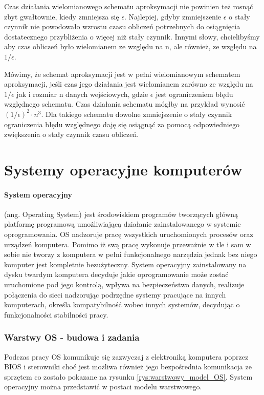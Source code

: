 \documentclass[a4paper,twoside]{report}
\begin{document}
Czas działania wielomianowego schematu aproksymacji nie powinien też rosnąć zbyt gwałtownie, kiedy zmniejsza się $\epsilon$. Najlepiej, gdyby zmniejszenie  $\epsilon$ o stały czynnik nie powodowało wzrostu czasu obliczeń potrzebnych do osiągnięcia dostatecznego przybliżenia o więcej niż stały czynnik. Innymi słowy, chcielibyśmy aby czas obliczeń było wielomianem ze względu na n, ale również, ze względu na $1/\epsilon$.

Mówimy, że schemat aproksymacji jest w pełni wielomianowym schematem aproksymacji, jeśli czas jego działania jest wielomianem zarówno ze względu na $1/\epsilon$ jak i rozmiar n danych wejściowych, gdzie $\epsilon$ jest ograniczeniem błędu względnego schematu. Czas działania schematu mógłby na przykład wynosić $ (1/\epsilon)^2 \cdot n^3 $. Dla takiego schematu dowolne zmniejszenie o stały czynnik ograniczenia błędu względnego daję się osiągnąć za pomocą odpowiedniego zwiększenia o stały czynnik czasu obliczeń.



\section{Systemy operacyjne komputerów}

\paragraph{System operacyjny}
(ang. Operating System) jest środowiskiem programów tworzących główną platformę programową umożliwiającą działanie zainstalowanego w systemie oprogramowania. OS nadzoruje pracę wszystkich uruchomionych procesów oraz urządzeń komputera. Pomimo iż swą pracę wykonuje przeważnie w tle i sam w sobie nie tworzy z komputera w pełni funkcjonalnego narzędzia jednak bez niego komputer jest kompletnie bezużyteczny. System operacyjny zainstalowany na dysku twardym komputera decyduje jakie oprogramowanie może zostać uruchomione pod jego kontrolą, wpływa na bezpieczeństwo danych, realizuje połączenia do sieci nadzorując podrzędne systemy pracujące na innych komputerach, określa kompatybilność wobec innych systemów, decydując o funkcjonalności stabilności pracy.

\subsubsection{Warstwy OS - budowa i zadania}
Podczas pracy OS komunikuje się zazwyczaj z elektroniką komputera poprzez BIOS i sterowniki choć jest możliwa również jego bezpośrednia komunikacja ze sprzętem co zostało pokazane na rysunku \ref{rys:warstwowy_model_OS}. System operacyjny można przedstawić w postaci modelu warstwowego.
\end{document}
